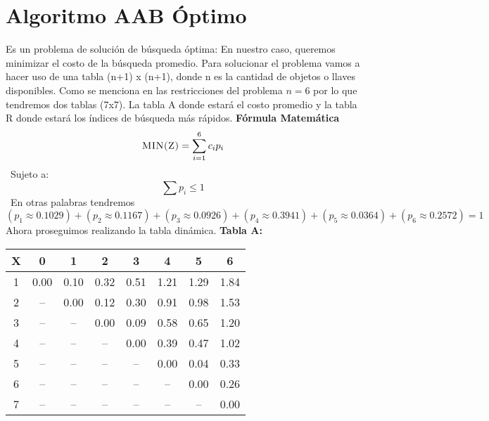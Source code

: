 \documentclass[10pt,letterpaper]{article}
\begin{document}
\section{Algoritmo AAB Óptimo} 
        Es un problema de solución de búsqueda óptima:  
        En nuestro caso, queremos minimizar el costo de la búsqueda promedio. 
        Para solucionar el problema vamos a hacer uso de una tabla (n+1) x (n+1), donde n es la cantidad 
        de objetos o llaves disponibles. 
        Como se menciona en las restricciones del problema $n = 6$ por lo que tendremos 
        dos tablas (7x7). La tabla A donde estará el costo promedio y la tabla R donde estará 
        los índices de búsqueda más rápidos. \newline \newline \newline 
        \textbf{\Large Fórmula Matemática} 
        \[ \textsc{\normalsize MIN(Z)}\\[0.5cm] = \sum_{i=1}^{6}c_{i}p_{i} \] 
        \ Sujeto a:  
        \[ \sum p_{i} \leq 1 \] 
        \ En otras palabras tendremos 
\[ (p_{1} \approx 0.1029)+(p_{2} \approx 0.1167)+(p_{3} \approx 0.0926)+(p_{4} \approx 0.3941)+(p_{5} \approx 0.0364)+(p_{6} \approx 0.2572) = 1 \]
\newline Ahora proseguimos realizando la tabla dinámica.
\newline \newline \newline \textbf{Tabla A: }
\begin{center}
\begin{tabu} to 1.0\textwidth { | c | c | c | c | c | c | c | c | }
\hline
{}\color{black}\textbf{X} & \color{black}\textbf{0} & \color{black}\textbf{1} & \color{black}\textbf{2} & \color{black}\textbf{3} & \color{black}\textbf{4} & \color{black}\textbf{5} & \color{black}\textbf{6} \\ 
\hline
{}\color{black}1 & 0.00 & 0.10 & 0.32 & 0.51 & 1.21 & 1.29 & 1.84 \\ 
\hline
{}\color{black}2 &  --  & 0.00 & 0.12 & 0.30 & 0.91 & 0.98 & 1.53 \\ 
\hline
{}\color{black}3 &  --  &  --  & 0.00 & 0.09 & 0.58 & 0.65 & 1.20 \\ 
\hline
{}\color{black}4 &  --  &  --  &  --  & 0.00 & 0.39 & 0.47 & 1.02 \\ 
\hline
{}\color{black}5 &  --  &  --  &  --  &  --  & 0.00 & 0.04 & 0.33 \\ 
\hline
{}\color{black}6 &  --  &  --  &  --  &  --  &  --  & 0.00 & 0.26 \\ 
\hline
{}\color{black}7 &  --  &  --  &  --  &  --  &  --  &  --  & 0.00 \\ 
\hline
\end{tabu} \\
\end{center}
\end{document}
